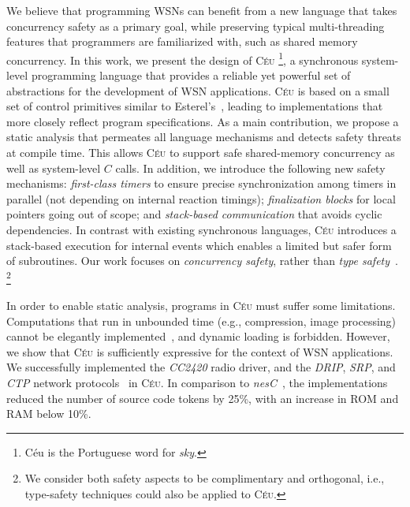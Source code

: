 \documentclass[letterpaper]{sig-alternate}
\newcommand{\CEU}{\textsc{C\'{e}u}\xspace}
\begin{document}
We believe that programming WSNs can benefit from a new language that takes 
concurrency safety as a primary goal, while preserving typical multi-threading 
features that programmers are familiarized with, such as shared memory 
concurrency.
%
In this work, we present the design of \CEU%
\footnote{C\'eu is the Portuguese word for \emph{sky}.},
a synchronous system-level programming language that provides a reliable yet 
powerful set of abstractions for the development of WSN applications.
%
\CEU is based on a small set of control primitives similar to 
Esterel's~\cite{esterel.ieee91}, leading to implementations that more closely 
reflect program specifications.
%
As a main contribution, we propose a static analysis that permeates all 
language mechanisms and detects safety threats at compile time.
This allows \CEU to support safe shared-memory concurrency as well as 
system-level $C$ calls.
%
In addition, we introduce the following new safety mechanisms:
\emph{first-class timers} to ensure precise synchronization among timers in 
parallel (not depending on internal reaction timings);
\emph{finalization blocks} for local pointers going out of scope;
and \emph{stack-based communication} that avoids cyclic dependencies.
%
In contrast with existing synchronous languages, \CEU introduces a stack-based 
execution for internal events which enables a limited but safer form of 
subroutines.
%
Our work focuses on \emph{concurrency safety}, rather than \emph{type 
safety}~\cite{wsn.safety}.%
\footnote{
We consider both safety aspects to be complimentary and orthogonal, i.e., 
type-safety techniques could also be applied to \CEU.
}

In order to enable static analysis, programs in \CEU must suffer some 
limitations.
Computations that run in unbounded time (e.g., compression, image processing) 
cannot be elegantly implemented~\cite{rp.hypothesis}, and dynamic loading is 
forbidden.
%
%
However, we show that \CEU is sufficiently expressive for the context of WSN 
applications.
We successfully implemented the \emph{CC2420} radio driver, and the 
\emph{DRIP}, \emph{SRP}, and \emph{CTP} network protocols~\cite{wsn.teps} in 
\CEU.
In comparison to \emph{nesC}~\cite{wsn.nesc}, the implementations reduced the 
number of source code tokens by 25\%, with an increase in ROM and RAM below 
10\%.
\end{document}
